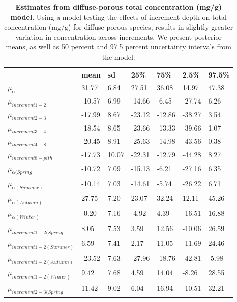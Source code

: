 \documentclass{article}\usepackage[]{graphicx}\usepackage[]{color}
\begin{document}
\begin{table}[ht]
\centering
\caption{\textbf{Estimates from diffuse-porous total concentration (mg/g) model}. Using a model testing the effects of increment depth on total concentration (mg/g) for diffuse-porous species, results in slightly greater variation in concentration across increments. We present posterior means, as well as 50 percent and 97.5 percent uncertainty intervals from the model.} 
\label{tab:difftot}
\begingroup\footnotesize
\begin{tabular}{|p{}|p{}|p{}|p{}|p{}|p{}|p{}|}
  \hline
 & mean & sd & 25\% & 75\% & 2.5\% & 97.5\% \\ 
  \hline
$\mu_{\alpha}$ & 31.77 & 6.84 & 27.51 & 36.08 & 14.97 & 47.38 \\ 
  $\mu_{increment 1-2}$ & -10.57 & 6.99 & -14.66 & -6.45 & -27.74 & 6.26 \\ 
  $\mu_{increment 2-3}$ & -17.99 & 8.67 & -23.12 & -12.86 & -38.27 & 3.54 \\ 
  $\mu_{increment 3-4}$ & -18.54 & 8.65 & -23.66 & -13.33 & -39.66 & 1.07 \\ 
  $\mu_{increment 4-8}$ & -20.45 & 8.91 & -25.63 & -14.98 & -43.56 & 0.38 \\ 
  $\mu_{increment 8-pith}$ & -17.73 & 10.07 & -22.31 & -12.79 & -44.28 & 8.27 \\ 
  $\mu_{\alpha (Spring}$ & -10.72 & 7.09 & -15.13 & -6.21 & -27.16 & 6.35 \\ 
  $\mu_{\alpha (Summer)}$ & -10.14 & 7.03 & -14.61 & -5.74 & -26.22 & 6.71 \\ 
  $\mu_{\alpha (Autumn)}$ & 27.75 & 7.20 & 23.07 & 32.24 & 12.11 & 45.26 \\ 
  $\mu_{\alpha (Winter)}$ & -0.20 & 7.16 & -4.92 & 4.39 & -16.51 & 16.88 \\ 
  $\mu_{increment 1-2 (Spring}$ & 8.05 & 7.53 & 3.59 & 12.56 & -10.06 & 26.59 \\ 
  $\mu_{increment 1-2 (Summer)}$ & 6.59 & 7.41 & 2.17 & 11.05 & -11.69 & 24.46 \\ 
  $\mu_{increment 1-2 (Autumn)}$ & -23.52 & 7.63 & -27.96 & -18.76 & -42.81 & -5.98 \\ 
  $\mu_{increment 1-2 (Winter)}$ & 9.42 & 7.68 & 4.59 & 14.04 & -8.26 & 28.55 \\ 
  $\mu_{increment 2-3 (Spring}$ & 11.42 & 9.02 & 6.04 & 16.94 & -10.51 & 32.21 \\ 

\end{tabular}
\end{table}
\end{document}
